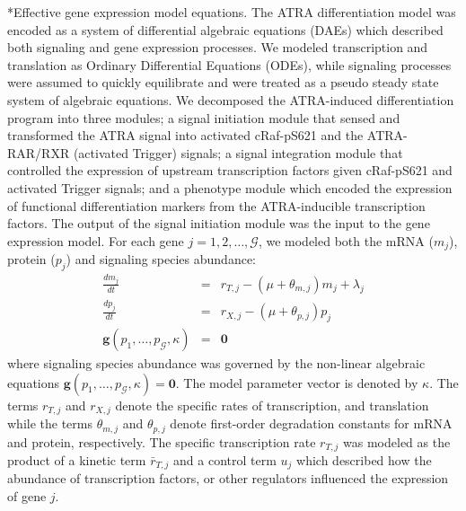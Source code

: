 \documentclass[12pt]{article}
\makeatletter
\renewcommand\subsubsection{\@startsection
	{subsubsection}{2}{0mm}
	{-0.05in}
	{-0.5\baselineskip}
	{\normalfont\normalsize\itshape}}
\makeatother
\begin{document}
\subsubsection*{Effective gene expression model equations.}
The ATRA differentiation model was encoded as a system of differential algebraic equations (DAEs) which described both signaling and gene expression processes.
We modeled transcription and translation as Ordinary Differential Equations (ODEs), while signaling processes were assumed to quickly equilibrate and were
treated as a pseudo steady state system of algebraic equations.
We decomposed the ATRA-induced differentiation program into three modules;
a signal initiation module that sensed and transformed the ATRA signal into activated cRaf-pS621 and the ATRA-RAR/RXR (activated Trigger) signals;
a signal integration module that controlled the expression of upstream transcription factors given cRaf-pS621 and activated Trigger signals; and
a phenotype module which encoded the expression of functional differentiation markers from the ATRA-inducible transcription factors.
The output of the signal initiation module was the input to the gene expression model.
For each gene $j=1,2,\dots,\mathcal{G}$, we modeled both the mRNA ($m_{j}$), protein ($p_{j}$) and signaling species abundance:
\begin{eqnarray}
	\frac{dm_{j}}{dt} &=& r_{T,j} - \left(\mu+\theta_{m,j}\right)m_{j}+\lambda_{j}\\
	\frac{dp_{j}}{dt} &=& r_{X,j} - \left(\mu+\theta_{p,j}\right)p_{j}\\\label{eqn-signaling-balances}
	\mathbf{g}\left(p_{1},\hdots,p_{\mathcal{G}},\kappa\right) &=& \mathbf{0}
\end{eqnarray}
where signaling species abundance was governed by the non-linear algebraic equations $\mathbf{g}\left(p_{1},\hdots,p_{\mathcal{G}},\kappa\right) = \mathbf{0}$.
The model parameter vector is denoted by $\kappa$.
The terms $r_{T,j}$ and $r_{X,j}$ denote the specific rates of transcription, and translation while
the terms $\theta_{m,j}$ and $\theta_{p,j}$ denote first-order degradation constants for mRNA and protein, respectively.
The specific transcription rate $r_{T,j}$ was modeled as the product of a kinetic term $\bar{r}_{T,j}$ and a control term $u_{j}$ which described how the
abundance of transcription factors, or other regulators influenced the expression of gene $j$.
\end{document}
